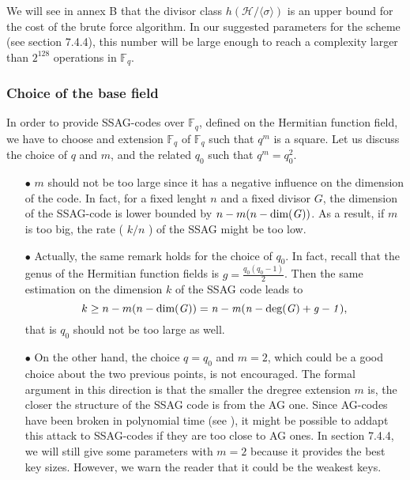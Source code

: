 \documentclass[10pt]{article}
\newcommand{\s}{\vspace{0.3cm}}
\newcommand{\calH}{\mathcal{H}}
\newcommand{\fq}{\mathbb{F}_q}
\begin{document}
\s 

We will see in annex B that the divisor class $h(\calH/\langle \sigma \rangle)$
is an upper bound for the cost of the brute force algorithm. In our suggested parameters for the scheme (see section 7.4.4), this number will be large enough to reach a complexity larger than $2^{128}$ operations in $\fq$.

\s

\subsubsection{Choice of the base field}

\s

In order to provide SSAG-codes over $\fq$, defined on the Hermitian function field, we have to choose and extension $\fq$ of $\fq$ such that $q^m$ is a square. Let us discuss the choice of $q$ and $m$, and the related $q_0$ such that $q^m=q_0^2$.

\begin{enumerate}
\item[$\bullet$] $m$ should not be too large since it has a negative influence on the dimension of the code. In fact, for a fixed lenght $n$ and a fixed divisor $G$, the dimension of the SSAG-code is lower bounded by $n-m(n-\rm dim \it (G))$. As a result, if $m$ is too big, the rate (\color{red} $k/n$ \color{black}) of the SSAG might be too low.
\item[$\bullet$] Actually, the same remark holds for the choice of $q_0$. In fact, recall that the genus of the Hermitian function fields is $g=\frac{q_0(q_0-1)}{2}$. Then the same estimation on the dimension $k$ of the SSAG code leads to 
\[k \geq n-m(n-\rm dim \it (G)) = n-m(n-\rm deg \it (G) +g-1),\]
that is $q_0$ should not be too large as well.
\item[$\bullet$] On the other hand, the choice $q=q_0$ and $m=2$, which could be a good choice about the two previous points, is not encouraged. The formal argument in this direction is that the smaller the dregree extension $m$ is, the closer the structure of the SSAG code is from the AG one. Since AG-codes have been broken in polynomial time (see \cite{Cou}), it might be possible to addapt this attack to SSAG-codes if they are too close to AG ones. In section 7.4.4, we will still give some parameters with $m=2$ because it provides the best key sizes. However, we warn the reader that it could be the weakest keys. 
\end{enumerate}
\end{document}

